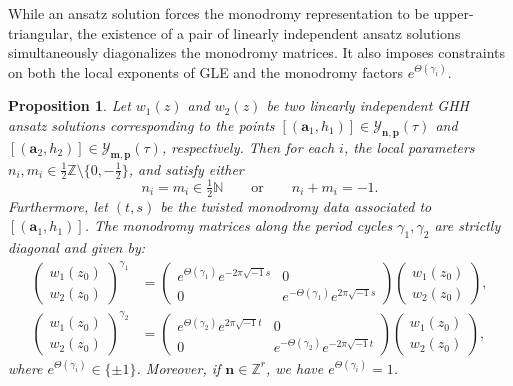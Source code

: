 \documentclass[11pt]{amsart}
\newtheorem{proposition}[theorem]{Proposition}
\theoremstyle{remark}
\numberwithin{equation}{section}
\begin{document}
While an ansatz solution forces the monodromy representation to be upper-triangular, the existence of a pair of linearly independent ansatz solutions simultaneously diagonalizes the monodromy matrices. It also imposes constraints on both the local exponents of GLE and the monodromy factors $e^{\Theta(\gamma_i)}$.
\begin{proposition} \label{prop:monodromy}
Let $w_1(z)$ and $w_2(z)$ be two linearly independent GHH ansatz solutions corresponding to the points $[(\mathbf{a}_1,h_1)] \in \mathcal{Y}_{\mathbf{n},\mathbf{p}}(\tau)$ and $[(\mathbf{a}_2,h_2)] \in \mathcal{Y}_{\mathbf{m},\mathbf{p}}(\tau)$, respectively. Then for each $i$, the local parameters $n_i, m_i \in \tfrac{1}{2}\mathbb{Z} \setminus \{0, -\tfrac{1}{2}\}$, and satisfy either
\[
    n_i = m_i \in \tfrac{1}{2} \mathbb{N} \qquad \text{or} \qquad n_i + m_i = -1.
\]
Furthermore, let $(t,s)$ be the twisted monodromy data associated to $[(\mathbf{a}_1,h_1)]$. The monodromy matrices along the period cycles $\gamma_1, \gamma_2$ are strictly diagonal and given by:
\[
\begin{split}
    \begin{pmatrix} w_1(z_0) \\ w_2(z_0) \end{pmatrix}^{\gamma_1} &= \begin{pmatrix} e^{\Theta(\gamma_1)} e^{-2\pi \sqrt{-1}s} & 0 \\ 0 & e^{-\Theta(\gamma_1)} e^{2\pi \sqrt{-1} s} \end{pmatrix} \begin{pmatrix} w_1(z_0) \\ w_2(z_0) \end{pmatrix},
    \\
    \begin{pmatrix} w_1(z_0) \\ w_2(z_0) \end{pmatrix}^{\gamma_2} &= \begin{pmatrix} e^{\Theta(\gamma_2)} e^{2\pi \sqrt{-1}t} & 0 \\ 0 & e^{-\Theta(\gamma_2)} e^{-2\pi \sqrt{-1} t} \end{pmatrix} \begin{pmatrix} w_1(z_0) \\ w_2(z_0) \end{pmatrix},
\end{split}
\]
where $e^{\Theta(\gamma_i)} \in \{ \pm 1 \}$. Moreover, if $\mathbf{n} \in \mathbb{Z}^r$, we have $e^{\Theta(\gamma_i)} = 1$.
\end{proposition}
\end{document}
